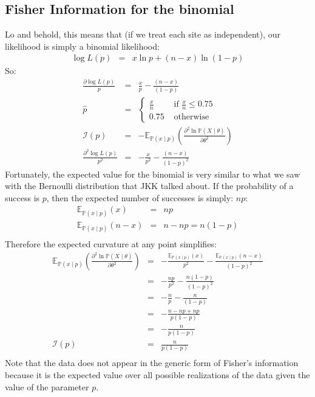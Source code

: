 \documentclass[11pt]{article}
\renewcommand{\Pr}{\mathbb{P}}
\begin{document}
\subsection{Fisher Information for the binomial}
Lo and behold, this means that (if we treat each site as independent), our likelihood is simply a binomial likelihood:
\begin{eqnarray}
\log L(p) & = & x \ln p + (n - x)\ln(1-p)
\end{eqnarray}
So:
\begin{eqnarray}
\frac{\partial\log L(p)}{p} & = & \frac{x}{p} - \frac{(n - x)}{(1-p)} \\
\hat{p} & = & \left\{\begin{array}{ll}
\frac{x}{n} & \mbox { if } \frac{x}{n} \leq 0.75 \\
0.75 & \mbox { otherwise }
\end{array} \right.  \\
\mathcal{I}(p) & = & - \mathbb{E}_{\Pr(x\mid p)}\left(\frac{\partial^2 \ln \Pr(X\mid\theta)}{\partial \theta^2}\right) \\
\frac{\partial^2\log L(p)}{p^2} & = & -\frac{x}{p^2} -\frac{(n-x)}{(1-p)^2}
\end{eqnarray}
Fortunately, the expected value for the binomial
    is very similar to what we saw with the Bernoulli 
    distribution that JKK talked about.
If the probability of a success is $p$, then the expected number of successes is simply:
$np$:
\begin{eqnarray}
\mathbb{E}_{\Pr(x\mid p)}\left(x\right) & = & np \\
\mathbb{E}_{\Pr(x\mid p)}\left(n- x\right) & = & n - np = n(1-p) \\
\end{eqnarray}
Therefore the expected curvature at any point simplifies:
\begin{eqnarray}
\mathbb{E}_{\Pr(x\mid p)}\left(\frac{\partial^2 \ln \Pr(X\mid\theta)}{\partial \theta^2}\right)
& = & -\frac{\mathbb{E}_{\Pr(x\mid p)}\left(x\right)}{p^2} -\frac{\mathbb{E}_{\Pr(x\mid p)}\left(n - x\right)}{(1-p)^2} \\
 & = & -\frac{np}{p^2} -\frac{n(1-p)}{(1-p)^2} \\
 & = & -\frac{n}{p} -\frac{n}{(1-p)} \\
 & = & -\frac{n - np + np}{p(1-p)} \\
 & = & -\frac{n}{p(1-p)} \\
 \mathcal{I}(p) & = & \frac{n}{p(1-p)} \\
\end{eqnarray}
Note that the data does not appear in the generic form of Fisher's information because it is the expected value over all possible realizations of the data given the value of the parameter $p$.
\end{document}
